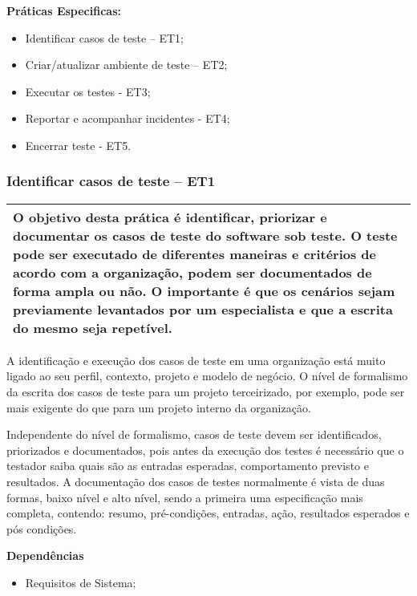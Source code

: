 \textbf{Práticas Especificas:}
\begin{itemize}
    \item Identificar casos de teste – ET1;
    \item Criar/atualizar ambiente de teste – ET2;
    \item Executar os testes - ET3;
    \item Reportar e acompanhar incidentes - ET4;
    \item Encerrar teste - ET5.
\end{itemize}

\subsubsection{Identificar casos de teste – ET1}
\label{sec:et1}

\begin{table}[H]
\centering
\begin{tabular}{|p{130mm}|}
\hline
O objetivo desta prática é identificar, priorizar e documentar os casos de teste do software sob teste. O teste pode ser executado de diferentes maneiras e critérios de acordo com a organização, podem ser documentados de forma ampla ou não. O importante é que os cenários sejam previamente levantados por um especialista e que a escrita do mesmo seja repetível. \\ 
\hline
\end{tabular}
\end{table}

A identificação e execução dos casos de teste em uma organização está muito ligado ao seu perfil, contexto, projeto e modelo de negócio. O nível de formalismo da escrita dos casos de teste para um projeto terceirizado, por exemplo, pode ser mais exigente do que para um projeto interno da organização.

Independente do nível de formalismo, casos de teste devem ser identificados, priorizados e documentados, pois antes da execução dos testes é necessário que o testador saiba quais são as entradas esperadas, comportamento previsto e resultados. A documentação dos casos de testes normalmente é vista de duas formas, baixo nível e alto nível, sendo a primeira uma especificação mais completa, contendo: resumo, pré-condições, entradas, ação, resultados esperados e pós condições.

\textbf{Dependências}
\begin{itemize}
    \item Requisitos de Sistema;
\end{itemize}

